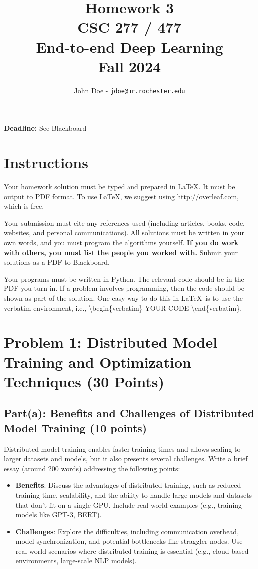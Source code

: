 \documentclass[11pt, oneside]{article}   	%
\title{Homework 3 \\ CSC 277 / 477 \\ End-to-end Deep Learning \\ Fall 2024}
\author{John Doe - \texttt{jdoe@ur.rochester.edu}}
\date{}
\begin{document}
\maketitle

\begin{center}
    \textbf{Deadline:} See Blackboard    
\end{center}


\section*{Instructions}

Your homework solution must be typed and prepared in \LaTeX. It must be output to PDF format. To use \LaTeX, we suggest using \url{http://overleaf.com}, which is free.

Your submission must cite any references used (including articles, books, code, websites, and personal communications).  All solutions must be written in your own words, and you must program the algorithms yourself. \textbf{If you do work with others, you must list the people you worked with.} Submit your solutions as a PDF to Blackboard. 


Your programs must be written in Python. The relevant code should be in the PDF you turn in. If a problem involves programming, then the code should be shown as part of the solution. One easy way to do this in \LaTeX \, is to use the verbatim environment, i.e., \textbackslash begin\{verbatim\} YOUR CODE \textbackslash end\{verbatim\}.








\clearpage

\section*{Problem 1: Distributed Model Training and Optimization Techniques (30 Points)}

\subsection*{Part(a): Benefits and Challenges of Distributed Model Training (10 points)} 
Distributed model training enables faster training times and allows scaling to larger datasets and models, but it also presents several challenges. Write a brief essay (around 200 words) addressing the following points:
\begin{itemize}
    \item \textbf{Benefits}: Discuss the advantages of distributed training, such as reduced training time, scalability, and the ability to handle large models and datasets that don’t fit on a single GPU. Include real-world examples (e.g., training models like GPT-3, BERT).
    \item \textbf{Challenges}: Explore the difficulties, including communication overhead, model synchronization, and potential bottlenecks like straggler nodes. Use real-world scenarios where distributed training is essential (e.g., cloud-based environments, large-scale NLP models).
\end{itemize}
\end{document}
